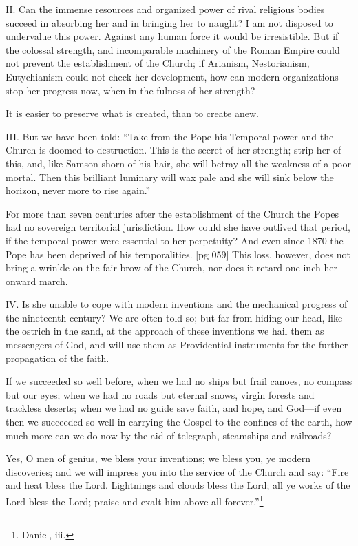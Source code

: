 II. Can the immense resources and organized
power of rival religious bodies succeed in absorbing
her and in bringing her to naught? I am not
disposed to undervalue this power. Against any
human force it would be irresistible. But if the
colossal strength, and incomparable machinery of
the Roman Empire could not prevent the establishment
of the Church; if Arianism, Nestorianism,
Eutychianism could not check her development,
how can modern organizations stop her
progress now, when in the fulness of her
strength?

It is easier to preserve what is created, than
to create anew.

III. But we have been told: “Take from the
Pope his Temporal power and the Church is
doomed to destruction. This is the secret of her
strength; strip her of this, and, like Samson shorn
of his hair, she will betray all the weakness of
a poor mortal. Then this brilliant luminary will
wax pale and she will sink below the horizon,
never more to rise again.”

For more than seven centuries after the establishment
of the Church the Popes had no sovereign
territorial jurisdiction. How could she
have outlived that period, if the temporal power
were essential to her perpetuity? And even since
1870 the Pope has been deprived of his temporalities.
[pg 059]
This loss, however, does not bring a wrinkle
on the fair brow of the Church, nor does it retard
one inch her onward march.

IV. Is she unable to cope with modern inventions
and the mechanical progress of the nineteenth
century? We are often told so; but far
from hiding our head, like the ostrich in the
sand, at the approach of these inventions we hail
them as messengers of God, and will use them as
Providential instruments for the further propagation
of the faith.

If we succeeded so well before, when we had no
ships but frail canoes, no compass but our eyes;
when we had no roads but eternal snows, virgin
forests and trackless deserts; when we had no
guide save faith, and hope, and God—if even then
we succeeded so well in carrying the Gospel to
the confines of the earth, how much more can we
do now by the aid of telegraph, steamships and
railroads?

Yes, O men of genius, we bless your inventions;
we bless you, ye modern discoveries; and we will
impress you into the service of the Church and
say: “Fire and heat bless the Lord. Lightnings
and clouds bless the Lord; all ye works of the
Lord bless the Lord; praise and exalt him above
all forever.”\footnote{Daniel, iii.}

